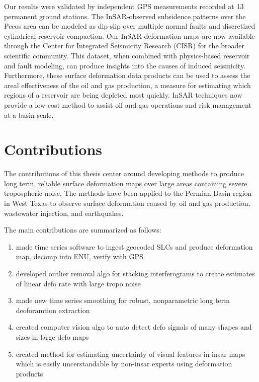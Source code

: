 \documentclass{utexasthesis}
\begin{document}
Our results were validated by independent GPS measurements recorded at 13 permanent ground stations. The InSAR-observed subsidence patterns over the Pecos area can be modeled as dip-slip over multiple normal faults and discretized cylindrical reservoir compaction. Our InSAR deformation maps are now available through the Center for Integrated Seismicity Research (CISR) for the broader scientific community. This dataset, when combined with physics-based reservoir and fault modeling, can produce insights into the causes of induced seismicity. Furthermore, these surface deformation data products can be used to assess the areal effectiveness of the oil and gas production, a measure for estimating which regions of a reservoir are being depleted most quickly. InSAR techniques now provide a low-cost method to assist oil and gas operations and risk management at a basin-scale.


\section{Contributions}
\label{sec:chap1-contributions}



The contributions of this thesis center around developing methods to produce long term, reliable surface deformation maps over large areas containing severe tropospheric noise. The methods have been applied to the Permian Basin region in West Texas to observe surface deformation caused by oil and gas production, wastewater injection, and earthquakes.


The main contributions are summarized as follows:

\begin{enumerate}

\item made time series software to ingest geocoded SLCs and produce deformation map, decomp into ENU, verify with GPS

\item developed outlier removal algo for stacking interferograms to create estimates of linear defo rate with large tropo noise
\item made new time series smoothing for robust, nonparametric long term deoforamtion extraction
\item created computer vision algo to auto detect defo signals of many shapes and sizes in large defo maps
\item created method for estimating uncertainty of visual features in insar maps which is easily uncerstandable by non-insar experts using deformation products
\end{enumerate}
\end{document}
